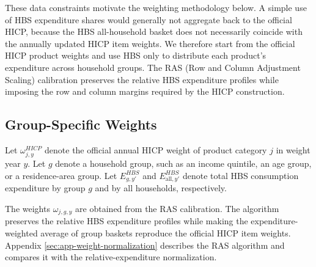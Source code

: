 \documentclass[11pt]{article}
\begin{document}


These data constraints motivate the weighting methodology below. A simple use of HBS expenditure
shares would generally not aggregate back to the official HICP, because the HBS all-household basket
does not necessarily coincide with the annually updated HICP item weights. We therefore start from
the official HICP product weights and use HBS only to distribute each product's expenditure across
household groups. The RAS (Row and Column Adjustment Scaling) calibration preserves the relative HBS
expenditure profiles while imposing the row and column margins required by the HICP construction.

\subsection*{Group-Specific Weights}

Let $\omega^{HICP}_{j,y}$ denote the official annual HICP weight of product category $j$ in weight
year $y$. Let $g$ denote a household group, such as an income quintile, an age group, or a
residence-area group. Let $E^{HBS}_{g,y'}$ and $E^{HBS}_{\mathrm{all},y'}$ denote total HBS
consumption expenditure by group $g$ and by all households, respectively.

The weights $\omega_{j,g,y}$ are obtained from the RAS calibration. The algorithm preserves the
relative HBS expenditure profiles while making the expenditure-weighted average of group baskets
reproduce the official HICP item weights. Appendix
\ref{sec:app-weight-normalization} describes the RAS algorithm and compares it
with the relative-expenditure normalization.
\end{document}

